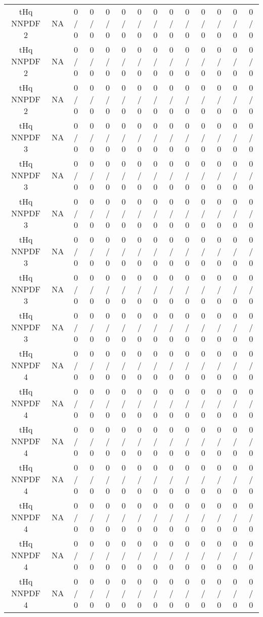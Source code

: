 \documentclass[10pt]{article}
\begin{document}
\begin{table}[htbp]
\begin{center}
\begin{tabular}{|c|c|c|c|c|c|c|c|c|c|c|c|c|c|}
  tHq NNPDF 2 &    NA    & 0 / 0 & 0 / 0 & 0 / 0 & 0 / 0 & 0 / 0 & 0 / 0 & 0 / 0 & 0 / 0 & 0 / 0 & 0 / 0 & 0 / 0 & 0 / 0 \\ 
  tHq NNPDF 2 &    NA    & 0 / 0 & 0 / 0 & 0 / 0 & 0 / 0 & 0 / 0 & 0 / 0 & 0 / 0 & 0 / 0 & 0 / 0 & 0 / 0 & 0 / 0 & 0 / 0 \\ 
  tHq NNPDF 2 &    NA    & 0 / 0 & 0 / 0 & 0 / 0 & 0 / 0 & 0 / 0 & 0 / 0 & 0 / 0 & 0 / 0 & 0 / 0 & 0 / 0 & 0 / 0 & 0 / 0 \\ 
  tHq NNPDF 3 &    NA    & 0 / 0 & 0 / 0 & 0 / 0 & 0 / 0 & 0 / 0 & 0 / 0 & 0 / 0 & 0 / 0 & 0 / 0 & 0 / 0 & 0 / 0 & 0 / 0 \\ 
  tHq NNPDF 3 &    NA    & 0 / 0 & 0 / 0 & 0 / 0 & 0 / 0 & 0 / 0 & 0 / 0 & 0 / 0 & 0 / 0 & 0 / 0 & 0 / 0 & 0 / 0 & 0 / 0 \\ 
  tHq NNPDF 3 &    NA    & 0 / 0 & 0 / 0 & 0 / 0 & 0 / 0 & 0 / 0 & 0 / 0 & 0 / 0 & 0 / 0 & 0 / 0 & 0 / 0 & 0 / 0 & 0 / 0 \\ 
  tHq NNPDF 3 &    NA    & 0 / 0 & 0 / 0 & 0 / 0 & 0 / 0 & 0 / 0 & 0 / 0 & 0 / 0 & 0 / 0 & 0 / 0 & 0 / 0 & 0 / 0 & 0 / 0 \\ 
  tHq NNPDF 3 &    NA    & 0 / 0 & 0 / 0 & 0 / 0 & 0 / 0 & 0 / 0 & 0 / 0 & 0 / 0 & 0 / 0 & 0 / 0 & 0 / 0 & 0 / 0 & 0 / 0 \\ 
  tHq NNPDF 3 &    NA    & 0 / 0 & 0 / 0 & 0 / 0 & 0 / 0 & 0 / 0 & 0 / 0 & 0 / 0 & 0 / 0 & 0 / 0 & 0 / 0 & 0 / 0 & 0 / 0 \\ 
  tHq NNPDF 4 &    NA    & 0 / 0 & 0 / 0 & 0 / 0 & 0 / 0 & 0 / 0 & 0 / 0 & 0 / 0 & 0 / 0 & 0 / 0 & 0 / 0 & 0 / 0 & 0 / 0 \\ 
  tHq NNPDF 4 &    NA    & 0 / 0 & 0 / 0 & 0 / 0 & 0 / 0 & 0 / 0 & 0 / 0 & 0 / 0 & 0 / 0 & 0 / 0 & 0 / 0 & 0 / 0 & 0 / 0 \\ 
  tHq NNPDF 4 &    NA    & 0 / 0 & 0 / 0 & 0 / 0 & 0 / 0 & 0 / 0 & 0 / 0 & 0 / 0 & 0 / 0 & 0 / 0 & 0 / 0 & 0 / 0 & 0 / 0 \\ 
  tHq NNPDF 4 &    NA    & 0 / 0 & 0 / 0 & 0 / 0 & 0 / 0 & 0 / 0 & 0 / 0 & 0 / 0 & 0 / 0 & 0 / 0 & 0 / 0 & 0 / 0 & 0 / 0 \\ 
  tHq NNPDF 4 &    NA    & 0 / 0 & 0 / 0 & 0 / 0 & 0 / 0 & 0 / 0 & 0 / 0 & 0 / 0 & 0 / 0 & 0 / 0 & 0 / 0 & 0 / 0 & 0 / 0 \\ 
  tHq NNPDF 4 &    NA    & 0 / 0 & 0 / 0 & 0 / 0 & 0 / 0 & 0 / 0 & 0 / 0 & 0 / 0 & 0 / 0 & 0 / 0 & 0 / 0 & 0 / 0 & 0 / 0 \\ 
  tHq NNPDF 4 &    NA    & 0 / 0 & 0 / 0 & 0 / 0 & 0 / 0 & 0 / 0 & 0 / 0 & 0 / 0 & 0 / 0 & 0 / 0 & 0 / 0 & 0 / 0 & 0 / 0 \\ 

\end{tabular}
\end{center}
\end{table}
\end{document}
